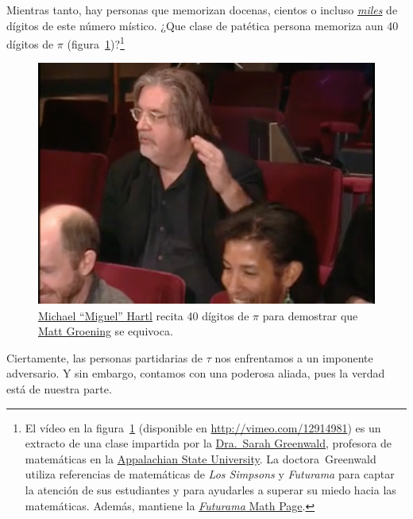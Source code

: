 Mientras tanto, hay personas que memorizan docenas, cientos o incluso  \href{http://www.pi-world-ranking-list.com/lists/details/luchaointerview.html}{\emph{miles}} de dígitos de este número místico. ¿Que clase de patética persona memoriza aun 40 dígitos de $\pi$ (figura~\ref{fig:futurama_video})?\footnote{El vídeo en la figura~\ref{fig:futurama_video} (disponible en  \href{http://vimeo.com/12914981}{http://vimeo.com/12914981}) es un extracto de una clase impartida por la \href{http://mathsci.appstate.edu/~sjg/}{Dra.\ Sarah Greenwald}, profesora de matemáticas en la \href{http://www.appstate.edu/}{Appalachian State University}. La doctora\ Greenwald utiliza referencias de matemáticas de \emph{Los Simpsons} y \emph{Futurama} para captar la atención de sus estudiantes y para ayudarles a superar su miedo hacia las matemáticas. Además, mantiene la \href{http://mathsci2.appstate.edu/~sjg/futurama/}{\emph{Futurama} Math Page}.}

\begin{figure}
\begin{center}
\includegraphics{images/figures/futurama_math_lecture.png} %
\end{center}
\caption{\href{https://tauday.com/tau-manifesto/\#sec-about_the_author}{Michael ``Miguel'' Hartl} recita 40 dígitos de $\pi$ para demostrar que \href{https://es.wikipedia.org/wiki/Matt_Groening}{Matt Groening} se equivoca.\label{fig:futurama_video}}
\end{figure}

Ciertamente, las personas partidarias de $\tau$ nos enfrentamos a un imponente adversario. Y sin embargo, contamos con una poderosa aliada, pues la verdad está de nuestra parte.

